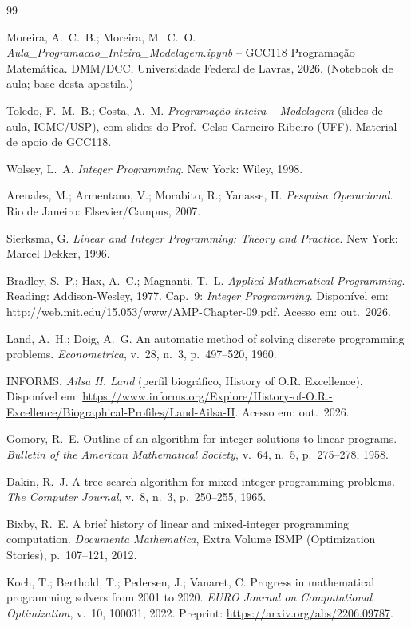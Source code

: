 \begin{thebibliography}{99}

Moreira, A.~C.~B.; Moreira, M.~C.~O.
\emph{Aula\_Programacao\_Inteira\_Modelagem.ipynb} -- GCC118 Programação Matemática. DMM/DCC, Universidade Federal de
Lavras, 2026. (Notebook de aula; base desta apostila.)

Toledo, F.~M.~B.; Costa, A.~M.
\emph{Programação inteira -- Modelagem} (slides de aula, ICMC/USP), com slides do Prof.\ Celso Carneiro Ribeiro (UFF).
Material de apoio de GCC118.

Wolsey, L.~A. \emph{Integer Programming}. New York: Wiley, 1998.

Arenales, M.; Armentano, V.; Morabito, R.; Yanasse, H. \emph{Pesquisa Operacional}. Rio de Janeiro: Elsevier/Campus,
2007.

Sierksma, G. \emph{Linear and Integer Programming: Theory and Practice}. New York: Marcel Dekker, 1996.

Bradley, S.~P.; Hax, A.~C.; Magnanti, T.~L. \emph{Applied Mathematical Programming}. Reading: Addison-Wesley, 1977.
Cap.~9: \emph{Integer Programming}. Disponível em: \url{http://web.mit.edu/15.053/www/AMP-Chapter-09.pdf}. Acesso em:
out.\ 2026.

Land, A.~H.; Doig, A.~G. An automatic method of solving discrete programming problems. \emph{Econometrica},
v.~28, n.~3, p.~497--520, 1960.

INFORMS. \emph{Ailsa H. Land} (perfil biográfico, History of O.R. Excellence). Disponível em:
\url{https://www.informs.org/Explore/History-of-O.R.-Excellence/Biographical-Profiles/Land-Ailsa-H}. Acesso em:
out.\ 2026.

Gomory, R.~E. Outline of an algorithm for integer solutions to linear programs. \emph{Bulletin of the American
Mathematical Society}, v.~64, n.~5, p.~275--278, 1958.

Dakin, R.~J. A tree-search algorithm for mixed integer programming problems. \emph{The Computer Journal}, v.~8,
n.~3, p.~250--255, 1965.

Bixby, R.~E. A brief history of linear and mixed-integer programming computation. \emph{Documenta Mathematica},
Extra Volume ISMP (Optimization Stories), p.~107--121, 2012.

Koch, T.; Berthold, T.; Pedersen, J.; Vanaret, C. Progress in mathematical programming solvers from 2001 to 2020.
\emph{EURO Journal on Computational Optimization}, v.~10, 100031, 2022. Preprint: \url{https://arxiv.org/abs/2206.09787}.


\end{thebibliography}
